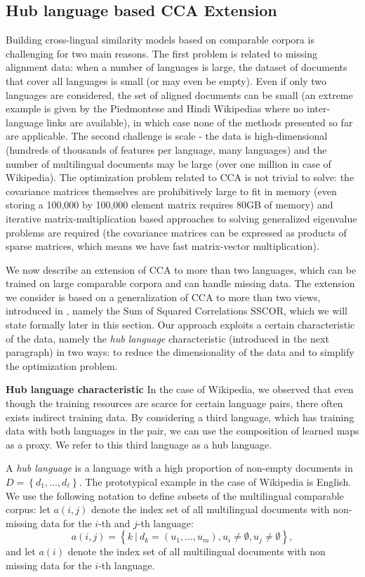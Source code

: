 \documentclass[twoside,11pt]{article}
\begin{document}
\subsection{Hub language based CCA Extension}\label{sec:hublang}
Building cross-lingual similarity models based on comparable corpora is challenging for two main reasons. The first problem is related to missing alignment data: when a number of languages is large, the dataset of documents that cover all languages is small (or may even be empty). Even if only two languages are considered, the set of aligned documents can be small (an extreme example is given by the Piedmontese and Hindi Wikipedias where no inter-language links are available), in which case none of the methods presented so far are applicable.
 The second challenge is scale - the data is high-dimensional (hundreds of thousands of features per language, many languages) and the number of multilingual documents may be large (over one million in case of Wikipedia). The optimization problem related to CCA is not
 trivial to solve: the covariance matrices themselves are prohibitively large to fit in memory (even storing a 100,000 by 100,000 element matrix requires 80GB of memory) and iterative matrix-multiplication based approaches to  solving generalized eigenvalue problems are required (the covariance matrices can be expressed as products of sparse matrices, which means we have fast matrix-vector multiplication).

We now describe an extension of CCA to more than two languages, which can be trained on large comparable corpora and can handle missing data.
 The extension we consider is based on a generalization of CCA to more than two views, introduced in \cite{Kettenring}, namely the Sum of Squared Correlations SSCOR, which we will state formally later in this section. Our approach exploits a certain characteristic of the data, namely the \emph{hub language} characteristic (introduced in the next paragraph) in two
 ways: to reduce the dimensionality of the data and to simplify the optimization problem.

\textbf{Hub language characteristic}
In the case of Wikipedia, we observed that even though the training resources are scarce for certain language pairs, there often exists indirect training data. By considering a third language, which has training data with both languages in the pair,  we can use the composition of learned maps as a proxy. We refer to this third language as a hub language.

A \emph{hub language} is a language with a high proportion of non-empty documents in $D = \left\{d_1,..., d_{\ell}\right\}$. The prototypical example in the case of Wikipedia is English. We use the following notation to define subsets of the multilingual comparable corpus: let $a(i,j)$ denote the index set of all multilingual documents with non-missing data for the $i$-th and $j$-th language:  $$a(i,j) = \left\{k~ |~ d_k = (u_1,...,u_m), u_i \neq \emptyset, u_j \neq \emptyset \right\},$$ and let $a(i)$ denote the index set of all multilingual documents with non missing data for the $i$-th language.
\end{document}
